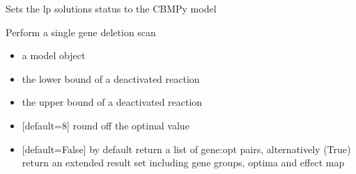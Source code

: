 \documentclass[letterpaper,10pt,english]{sphinxmanual}
\begin{document}

\begin{fulllineitems}
\label{\detokenize{modules_doc:cbmpy.CBCPLEX.cplx_setSolutionStatusToModel}}
\pysigstartsignatures
{}
\pysigstopsignatures
\sphinxAtStartPar
Sets the lp solutions status to the CBMPy model

\end{fulllineitems}


\begin{fulllineitems}
\label{\detokenize{modules_doc:cbmpy.CBCPLEX.cplx_singleGeneScan}}
\pysigstartsignatures
{}
\pysigstopsignatures
\sphinxAtStartPar
Perform a single gene deletion scan
\begin{itemize}
\item {} 
\sphinxAtStartPar
{} a model object

\item {} 
\sphinxAtStartPar
{} the lower bound of a deactivated reaction

\item {} 
\sphinxAtStartPar
{} the upper bound of a deactivated reaction

\item {} 
\sphinxAtStartPar
{} {[}default=8{]} round off the optimal value

\item {} 
\sphinxAtStartPar
{} {[}default=False{]} by default return a list of gene:opt pairs, alternatively (True) return an extended result set including gene groups, optima and effect map

\end{itemize}

\end{fulllineitems}
\end{document}
